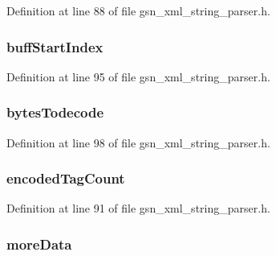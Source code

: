 Definition at line 88 of file gsn\_\-xml\_\-string\_\-parser.h.

\hypertarget{a00444_a6178554e1bb83aae2258e3cc168aec36}{
\subsubsection[{buffStartIndex}]{ {\bf buffStartIndex}}}
\label{a00444_a6178554e1bb83aae2258e3cc168aec36}


Definition at line 95 of file gsn\_\-xml\_\-string\_\-parser.h.

\hypertarget{a00444_a1058fa8ac42f111ebc5e4efeea0afaa3}{
\subsubsection[{bytesTodecode}]{ {\bf bytesTodecode}}}
\label{a00444_a1058fa8ac42f111ebc5e4efeea0afaa3}


Definition at line 98 of file gsn\_\-xml\_\-string\_\-parser.h.

\hypertarget{a00444_a870bf7003d973454764fa37ac86f0c7b}{
\subsubsection[{encodedTagCount}]{ {\bf encodedTagCount}}}
\label{a00444_a870bf7003d973454764fa37ac86f0c7b}


Definition at line 91 of file gsn\_\-xml\_\-string\_\-parser.h.

\hypertarget{a00444_ac22d776ac2378280cc3c0b3b84141d02}{
\subsubsection[{moreData}]{ {\bf moreData}}}
\label{a00444_ac22d776ac2378280cc3c0b3b84141d02}


